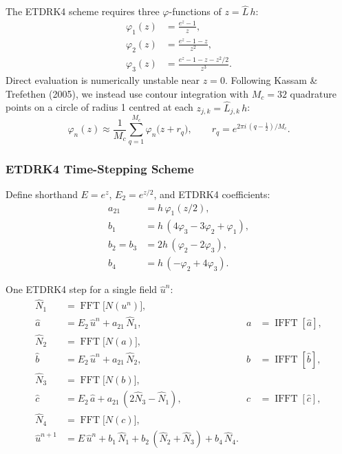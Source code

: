 \documentclass[11pt, letterpaper]{article}
\theoremstyle{definition}
\DeclareMathOperator{\fftn}{FFT}
\DeclareMathOperator{\ifftn}{IFFT}
\begin{document}
The ETDRK4 scheme requires three $\varphi$-functions of $z = \hat{L}\,h$:
\begin{align}
  \varphi_1(z) &= \frac{e^{z} - 1}{z}, \label{eq:phi1}\\
  \varphi_2(z) &= \frac{e^{z} - 1 - z}{z^{2}}, \label{eq:phi2}\\
  \varphi_3(z) &= \frac{e^{z} - 1 - z - z^{2}/2}{z^{3}}. \label{eq:phi3}
\end{align}
Direct evaluation is numerically unstable near $z = 0$.  Following
Kassam \& Trefethen (2005), we instead use contour integration with
$M_c = 32$ quadrature points on a circle of radius 1 centred at each
$z_{j,k} = \hat{L}_{j,k}\,h$:
\begin{equation}
\label{eq:contour-quad}
  \varphi_n(z) \approx \frac{1}{M_c}
  \sum_{q=1}^{M_c} \varphi_n\!\bigl(z + r_q\bigr),
  \qquad
  r_q = e^{2\pi i\,(q - \frac{1}{2})/M_c}.
\end{equation}

\subsubsection{ETDRK4 Time-Stepping Scheme}
\label{sec:etdrk4-scheme}

Define shorthand $E = e^{z}$, $E_2 = e^{z/2}$, and ETDRK4 coefficients:
\begin{align}
  a_{21} &= h \,\varphi_{1}(z/2), \label{eq:etdrk4-a21}\\
  b_1 &= h\,(4\varphi_3 - 3\varphi_2 + \varphi_1), \label{eq:etdrk4-b1}\\
  b_2 = b_3 &= 2h\,(\varphi_2 - 2\varphi_3), \label{eq:etdrk4-b23}\\
  b_4 &= h\,(-\varphi_2 + 4\varphi_3). \label{eq:etdrk4-b4}
\end{align}

One ETDRK4 step for a single field $\hat{u}^n$:
\begin{align}
  \hat{N}_1 &= \fftn\!\bigl[N(u^n)\bigr], \nonumber\\
  \hat{a}   &= E_2\,\hat{u}^n + a_{21}\,\hat{N}_1,
  & a &= \ifftn[\hat{a}], \nonumber\\
  \hat{N}_2 &= \fftn\!\bigl[N(a)\bigr], \nonumber\\
  \hat{b}   &= E_2\,\hat{u}^n + a_{21}\,\hat{N}_2,
  & b &= \ifftn[\hat{b}], \nonumber\\
  \hat{N}_3 &= \fftn\!\bigl[N(b)\bigr], \nonumber\\
  \hat{c}   &= E_2\,\hat{a} + a_{21}\,(2\hat{N}_3 - \hat{N}_1),
  & c &= \ifftn[\hat{c}], \nonumber\\
  \hat{N}_4 &= \fftn\!\bigl[N(c)\bigr], \nonumber\\
  \hat{u}^{n+1}
    &= E\,\hat{u}^n + b_1\,\hat{N}_1 + b_2\,(\hat{N}_2 + \hat{N}_3) + b_4\,\hat{N}_4.
\label{eq:etdrk4-step}
\end{align}
\end{document}
